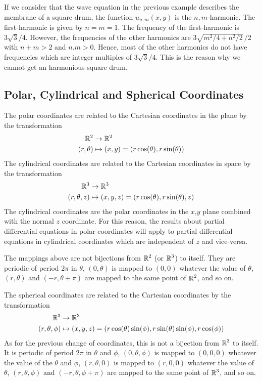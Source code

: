 \begin{rmk}
If we consider that the wave equation in the previous example describes the
membrane of a square drum, the function
$\displaystyle u_{n,m}(x,y)$ is the $n,m$-harmonic.  The
first-harmonic is given by $n=m
=1$.  The frequency of the
first-harmonic is $3\sqrt{3}/4$.  However, the frequencies of the
other harmonics are $3\sqrt{m^2/4 + n^2/2}\,/2$ with $n+m >2$ and
$n.m>0$.  Hence, most of the other harmonics do not have frequencies
which are integer multiples of $3\sqrt{3}/4$.  This is the reason why
we cannot get an harmonious square drum.
\end{rmk}

\subsection{Polar, Cylindrical and Spherical Coordinates}
\label{wave_cyl_sph_coord}

The polar coordinates are related to the Cartesian coordinates in the
plane by the transformation
\begin{align*}
\mathbb{R}^2 & \rightarrow \mathbb{R}^2 \\
(r,\theta) & \mapsto (x,y) = (r \cos(\theta), r\sin(\theta))
\end{align*}
The cylindrical coordinates are related to the Cartesian coordinates
in space by the transformation
\begin{align*}
\mathbb{R}^3 & \rightarrow \mathbb{R}^3 \\
(r,\theta, z) & \mapsto (x,y,z) = (r \cos(\theta), r\sin(\theta), z)
\end{align*}
The cylindrical coordinates are the polar coordinates in the $x$,$y$
plane combined with the normal $z$ coordinate.  For this reason, the
results about partial differential equations in polar coordinates will
apply to partial differential equations in 
cylindrical coordinates which are independent of $z$ and vice-versa.

The mappings above are not bijections from $\displaystyle \mathbb{R}^2$ (or
$\displaystyle \mathbb{R}^3$) to itself.  They are periodic of period $2\pi$
in $\theta$, $(0,\theta)$ is mapped to $(0,0)$ whatever the value of $\theta$,
$(r,\theta)$ and $(-r, \theta+\pi)$ are mapped to the same point
of $\displaystyle \mathbb{R}^2$, and so on.

The spherical coordinates are related to the Cartesian coordinates by
the transformation
\begin{align*}
\mathbb{R}^3 & \rightarrow \mathbb{R}^3 \\
(r,\theta, \phi) & \mapsto (x,y,z) =
(r \cos(\theta)\sin(\phi), r\sin(\theta)\sin(\phi), r \cos(\phi))
\end{align*}
As for the previous change of coordinates, this is not a bijection
from $\displaystyle \mathbb{R}^3$ to itself.  It is periodic of period $2\pi$
in $\theta$ and $\phi$, $(0,\theta, \phi)$ is mapped to $(0,0,0)$ whatever the
value of the $\theta$ and $\phi$, $(r,\theta, 0)$ is mapped to
$(r,0,0)$ whatever the value of $\theta$, $(r,\theta, \phi)$ and $(-r,
\theta, \phi+\pi)$ are mapped to the same point of
$\displaystyle \mathbb{R}^3$, and so on.

